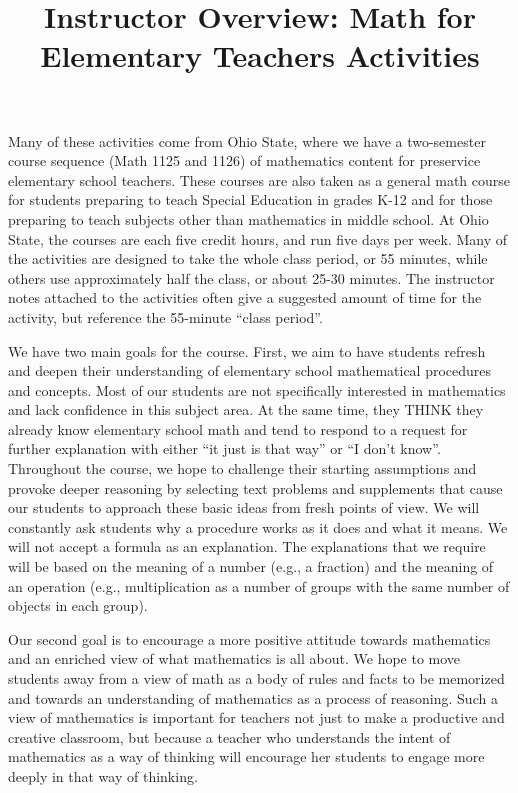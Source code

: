 \documentclass{ximera}
\title{Instructor Overview: Math for Elementary Teachers Activities}
\begin{document}
\begin{abstract}\end{abstract}\maketitle

Many of these activities come from Ohio State, where we have a two-semester course sequence 
(Math 1125 and 1126) of mathematics content for preservice elementary school teachers.  These 
courses are also taken as a general math course for students preparing 
to teach Special Education in grades K-12 and for those preparing to teach subjects other than 
mathematics in middle school.  At Ohio State, the courses are each five credit 
hours, and run five days per week.  Many of the activities are designed to take the whole class 
period, or 55 minutes, while others use approximately half the class, or about 25-30 minutes.  
The instructor notes attached to the activities often give a suggested amount of time for the 
activity, but reference the 55-minute ``class period''.

We have two main goals for the course.  First, we aim to have students refresh and deepen their 
understanding of elementary school mathematical procedures and concepts.  Most of our students 
are not specifically interested in mathematics and lack confidence in this subject area.  At the 
same time, they THINK they already know elementary school math and tend to respond to a request 
for further explanation with either ``it just is that way'' or ``I don't know''.  Throughout the 
course, we hope to challenge their starting assumptions and provoke deeper reasoning by selecting 
text problems and supplements that cause our students to approach these basic ideas from fresh 
points of view.  We will constantly ask students why a procedure works as it does and what it 
means.  We will not accept a formula as an explanation.  The explanations that we require will be 
based on the meaning of a number (e.g., a fraction) and the meaning of an operation (e.g., 
multiplication as a number of groups with the same number of objects in each group).  

Our second goal is to encourage a more positive attitude towards mathematics and an enriched view 
of what mathematics is all about.  We hope to move students away from a view of math as a body of 
rules and facts to be memorized and towards an understanding of mathematics as a process of 
reasoning. Such a view of mathematics is important for teachers not just to make a productive and 
creative classroom, but because a teacher who understands the intent of mathematics as a way of 
thinking will encourage her students to engage more deeply in that way of thinking.  
\end{document}
